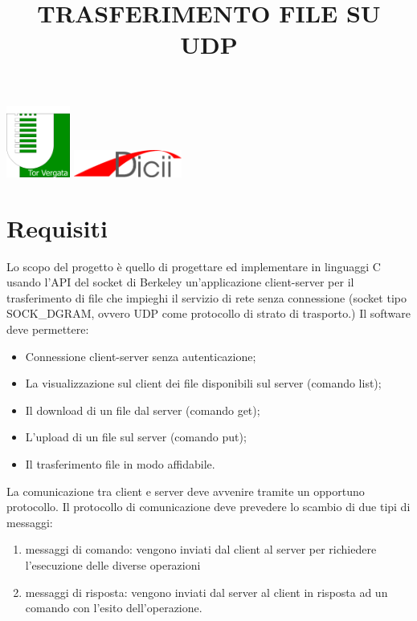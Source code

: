 \documentclass[12pt]{article}
\title{\uppercase{Trasferimento file su UDP}}
\begin{document}
\includegraphics[width=2.1cm, valign=t]{image1}
\hfill
\includegraphics[width=3.55cm, valign=t]{image2}
{\let\newpage\relax\maketitle}
\tableofcontents
\pagebreak
\section{Requisiti} {

Lo scopo del progetto è quello di progettare ed implementare in linguaggi C
usando l'API del socket di Berkeley un'applicazione client-server per il
trasferimento di file che impieghi il servizio di rete senza connessione
(socket tipo SOCK\_DGRAM, ovvero UDP come protocollo di strato di trasporto.)
Il software deve permettere:

\begin{itemize}
    \item Connessione client-server senza autenticazione;
    \item La visualizzazione sul client dei file disponibili sul server
          (comando list);
    \item Il download di un file dal server (comando get);
    \item L'upload di un file sul server (comando put);
    \item Il trasferimento file in modo affidabile.
\end{itemize}

La comunicazione tra client e server deve avvenire tramite un opportuno
protocollo. Il protocollo di comunicazione deve prevedere lo scambio di due
tipi di messaggi:

\begin{enumerate}
    \item messaggi di comando: vengono inviati dal client al server per
          richiedere l'esecuzione delle diverse operazioni
    \item messaggi di risposta: vengono inviati dal server al client in risposta
          ad un comando con l'esito dell'operazione.
\end{enumerate}

}
\end{document}
